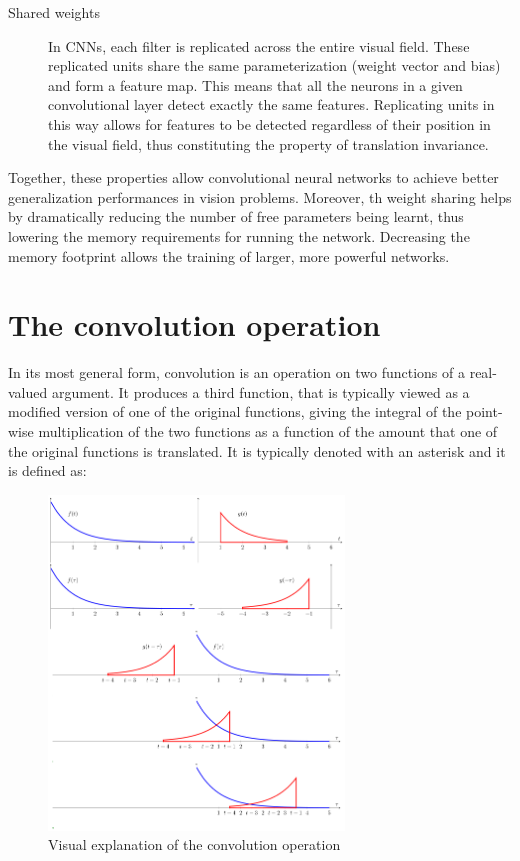 \begin{description}
	\item[Shared weights] In \acsp{CNN}, each filter is replicated across the entire visual field. These replicated units share the same parameterization (weight vector and bias) and form a feature map. This means that all the neurons in a given convolutional layer detect exactly the same features. Replicating units in this way allows for features to be detected regardless of their position in the visual field, thus constituting the property of translation invariance.
	
\end{description}

Together, these properties allow convolutional neural networks to achieve better generalization performances in vision problems. Moreover, th weight sharing helps by dramatically reducing the number of free parameters being learnt, thus lowering the memory requirements for running the network. Decreasing the memory footprint allows the training of larger, more powerful networks.

\section{The convolution operation}

In its most general form, convolution is an operation on two functions of a real-valued argument. It produces a third function, that is typically viewed as a modified version of one of the original functions, giving the integral of the point-wise multiplication of the two functions as a function of the amount that one of the original functions is translated. It is typically
denoted with an asterisk and it is defined as:

\begin{figure}[t]
	\centering
	\includegraphics[width=0.7\textwidth]{Images/convolution}
	\caption{Visual explanation of the convolution operation}\label{fig:convolution}
\end{figure}


